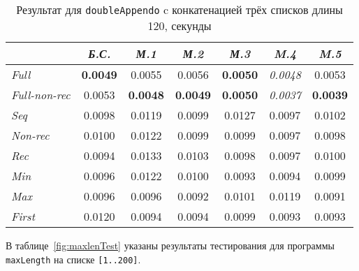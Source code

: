 \begin{table}[h!]
\center
\begin{tabular}{|l|c|c|c|c|c|c|}
\hline
                   &{\it Б.С.}&{\it М.1}&{\it М.2}&{\it М.3}&{\it M.4} & {\it M.5} \\ \hline
{\it Full        }& {\bf 0.0049}  & 0.0055       & 0.0056       & {\bf 0.0050} & {\it 0.0048} & 0.0053\\ \hline
{\it Full-non-rec}& 0.0053        & {\bf 0.0048} & {\bf 0.0049} & {\bf 0.0050} & {\it 0.0037} & {\bf 0.0039} \\ \hline
{\it Seq         }& 0.0098        & 0.0119       & 0.0099       & 0.0127       & 0.0097       & 0.0102 \\ \hline
{\it Non-rec     }& 0.0100        & 0.0122       & 0.0099       & 0.0099       & 0.0097       & 0.0098 \\ \hline
{\it Rec         }& 0.0094        & 0.0133       & 0.0103       & 0.0098       & 0.0097       & 0.0100 \\ \hline
{\it Min         }& 0.0096        & 0.0122       & 0.0100       & 0.0093       & 0.0094       & 0.0099 \\ \hline
{\it Max         }& 0.0096        & 0.0096       & 0.0092       & 0.0101       & 0.0119       & 0.0091 \\ \hline
{\it First       }& 0.0120        & 0.0094       & 0.0094       & 0.0099       & 0.0093       & 0.0093 \\ \hline

\end{tabular}
\caption{Результат для \lstinline{doubleAppendo} c конкатенацией трёх списков длины 120, секунды}
\label{fig:dappTest}
\end{table}

В таблице~\ref{fig:maxlenTest} указаны результаты тестирования для
программы \lstinline{maxLength} на списке \lstinline{[1..200]}.

